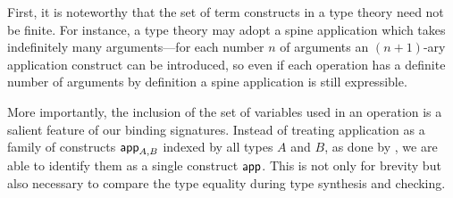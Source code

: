 \documentclass[acmsmall,screen]{acmart}
\theoremstyle{acmdefinition}
\begin{document}
First, it is noteworthy that the set of term constructs in a type theory need not be finite.
For instance, a type theory may adopt a spine application which takes indefinitely many arguments---for each number $n$ of arguments an $(n+1)$-ary application construct can be introduced, so even if each operation has a definite number of arguments by definition a spine application is still expressible.

More importantly, the inclusion of the set of variables used in an operation is a salient feature of our binding signatures.
Instead of treating application as a family of constructs $\mathsf{app}_{A, B}$ indexed by all types $A$ and $B$, as done by \citet{Fiore2022}, we are able to identify them as a single construct $\mathsf{app}$.
This is not only for brevity but also necessary to compare the type equality during type synthesis and checking.

%
%
%
\end{document}
